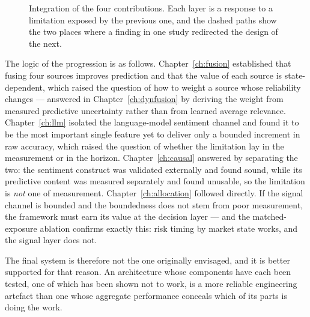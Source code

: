 \begin{figure}[!htb]
{}
\caption[Integration of the four research contributions]{Integration of the four contributions.
Each layer is a response to a limitation exposed by the previous one, and the dashed paths show the
two places where a finding in one study redirected the design of the next.}
\label{fig:integrated}
\end{figure}

The logic of the progression is as follows. Chapter~\ref{ch:fusion} established that fusing four
sources improves prediction and that the value of each source is state-dependent, which raised the
question of how to weight a source whose reliability changes --- answered in
Chapter~\ref{ch:dynfusion} by deriving the weight from measured predictive uncertainty rather than
from learned average relevance. Chapter~\ref{ch:llm} isolated the language-model sentiment channel
and found it to be the most important single feature yet to deliver only a bounded increment in
raw accuracy, which raised the question of whether the limitation lay in the measurement or in the
horizon. Chapter~\ref{ch:causal} answered by separating the two: the sentiment construct was
validated externally and found sound, while its predictive content was measured separately and
found unusable, so the limitation is \emph{not} one of measurement. Chapter~\ref{ch:allocation}
followed directly. If the signal channel is bounded and the boundedness does not stem from poor
measurement, the framework must earn its value at the decision layer --- and the matched-exposure
ablation confirms exactly this: risk timing by market state works, and the signal layer does not.

The final system is therefore not the one originally envisaged, and it is better supported for
that reason. An architecture whose components have each been tested, one of which has been shown
not to work, is a more reliable engineering artefact than one whose aggregate performance conceals
which of its parts is doing the work.

